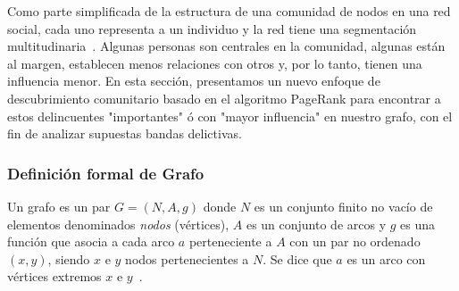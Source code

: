 Como parte simplificada de la estructura de una comunidad de nodos en una red social, cada uno representa a un individuo y la red tiene una segmentación multitudinaria~\cite{ma2014exploring}. Algunas personas son centrales en la comunidad, algunas están al margen, establecen menos relaciones con otros y, por lo tanto, tienen una influencia menor. En esta sección, presentamos un nuevo enfoque de descubrimiento comunitario basado en el algoritmo PageRank para encontrar a estos delincuentes "importantes" ó con "mayor influencia" en nuestro grafo, con el fin de analizar supuestas bandas delictivas.

\subsubsection{Definición formal de Grafo}
Un grafo es un par $G = (N, A, g)$ donde $N$ es un conjunto finito no vacío de elementos denominados \textit{nodos} (vértices), $A$ es un conjunto de arcos y $g$ es una función que asocia a cada arco $a$ perteneciente a $A$ con un par no ordenado $(x, y)$, siendo $x$ e $y$ nodos pertenecientes a $N$. Se dice que $a$ es un arco con vértices extremos $x$ e $y$~\cite{dubinsky1984mathematical}.

